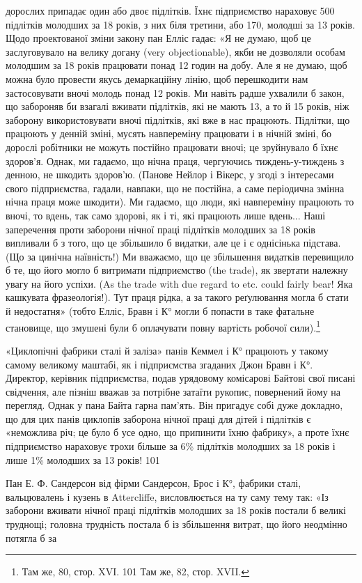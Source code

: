 дорослих припадає один або двоє підлітків. Їхнє підприємство нараховує
500 підлітків молодших за 18 років, з них біля третини,
або 170, молодші за 13 років. Щодо проектованої зміни закону
пан Елліс гадає: «Я не думаю, щоб це заслуговувало на велику
догану (very objectionable), якби не дозволяли особам молодшим
за 18 років працювати понад 12 годин на добу. Але я не думаю,
щоб можна було провести якусь демаркаційну лінію, щоб перешкодити
нам застосовувати вночі молодь понад 12 років. Ми навіть
радше ухвалили б закон, що забороняв би взагалі вживати
підлітків, які не мають 13, а то й 15 років, ніж заборону використовувати
вночі підлітків, які вже в нас працюють. Підлітки,
що працюють у денній зміні, мусять навпереміну працювати і
в нічній зміні, бо дорослі робітники не можуть постійно працювати
вночі; це зруйнувало б їхнє здоров’я. Однак, ми гадаємо,
що нічна праця, чергуючись тиждень-у-тиждень з денною,
не шкодить здоров’ю. (Панове Нейлор і Вікерс, у згоді з інтересами
свого підприємства, гадали, навпаки, що не постійна, а
саме періодична змінна нічна праця може шкодити). Ми гадаємо,
що люди, які навпереміну працюють то вночі, то вдень, так само
здорові, як і ті, які працюють лише вдень... Наші заперечення
проти заборони нічної праці підлітків молодших за 18 років
випливали б з того, що це збільшило б видатки, але це і є однісінька
підстава. (Що за цинічна наївність!) Ми вважаємо, що це
збільшення видатків перевищило б те, що його могло б витримати
підприємство (the trade), як звертати належну увагу на його
успіхи. (As the trade with due regard to etc. could fairly bear!
Яка кашкувата фразеологія!). Тут праця рідка, а за такого реґулювання
могла б стати й недостатня» (тобто Елліс, Бравн і К°
могли б попасти в таке фатальне становище, що змушені були б
оплачувати повну вартість робочої сили).\footnote{
Там же, 80, стор. XVI.
101 Там же, 82, стор. XVII.
}

«Циклопічні фабрики сталі й заліза» панів Кеммел і К°
працюють у такому самому великому маштабі, як і підприємства
згаданих Джон Бравн і К°. Директор, керівник підприємства,
подав урядовому комісарові Байтові свої писані свідчення, але
пізніш вважав за потрібне затаїти рукопис, повернений йому на
перегляд. Однак у пана Байта гарна пам’ять. Він пригадує собі
дуже докладно, що для цих панів циклопів заборона нічної
праці для дітей і підлітків є «неможлива річ; це було б усе одно,
що припинити їхню фабрику», а проте їхнє підприємство нараховує
трохи більше за 6\% підлітків молодших за 18 років і лише
1\% молодших за 13 років! 101

Пан Е. Ф. Сандерсон від фірми Сандерсон, Брос і К°, фабрики
сталі, вальцювалень і кузень в Attercliffe, висловлюється на ту
саму тему так: «Із заборони вживати нічної праці підлітків молодших
за 18 років постали б великі труднощі; головна трудність
постала б із збільшення витрат, що його неодмінно потягла б за
